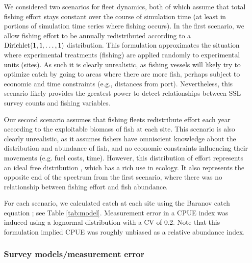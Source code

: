 \documentclass[nonumbib,leqno]{nrc1}
\begin{document}
We considered two scenarios for fleet dynamics, both of which assume that total fishing effort stays constant
over the course of simulation time (at least in portions of simulation time series where fishing occurs).  In the first scenario, we allow fishing effort to be annually redistributed according to a ${\rm Dirichlet}(1,1,\hdots,1)$ distribution.  This formulation approximates the situation where experimental treatments (fishing) are applied randomly to experimental units (sites).  As such it is clearly unrealistic, as fishing vessels will likely try to optimize catch by going to areas where there are more fish, perhaps subject
to economic and time constraints (e.g., distances from port).  Nevertheless, this scenario likely provides the greatest power to detect relationships between SSL survey counts and fishing variables.

Our second scenario assumes that fishing fleets redistribute effort each year according to the exploitable biomass of fish at each site.  This scenario is also clearly unrealistic, as it assumes fishers have omniscient knowledge about the distribution and abundance of fish, and no economic constraints influencing their movements (e.g. fuel costs, time).  However, this distribution of effort represents an ideal free distribution \citep{FretwellLucas1970}, which has a rich use in ecology.  It also represents the opposite end of the spectrum from the first scenario, where there was no relationship between fishing effort and fish abundance.

For each scenario, we calculated catch at each site using the Baranov catch equation \citep{Baranov1918}; see Table \ref{tab:model}.  Measurement error in a CPUE index was induced using a lognormal distribution with a CV of 0.2.  Note that this formulation implied CPUE was roughly unbiased as a relative abundance index.


\subsubsection{Survey models/measurement error}
\end{document}
